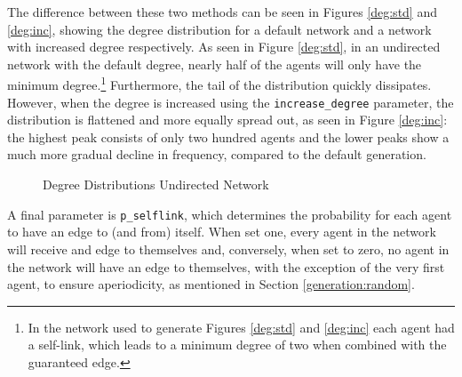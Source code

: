 \documentclass[a4paper, 12pt]{report}
\begin{document}
\noindent The difference between these two methods can be seen in Figures \ref{deg:std} and \ref{deg:inc}, showing the degree distribution for a default network and a network with increased degree respectively. As seen in Figure \ref{deg:std}, in an undirected network with the default degree, nearly half of the agents will only have the minimum degree.\footnote{In the network used to generate Figures \ref{deg:std} and \ref{deg:inc} each agent had a self-link, which leads to a minimum degree of two when combined with the guaranteed edge.} Furthermore, the tail of the distribution quickly dissipates. However, when the degree is increased using the \texttt{increase\_degree} parameter, the distribution is flattened and more equally spread out, as seen in Figure \ref{deg:inc}: the highest peak consists of only two hundred agents and the lower peaks show a much more gradual decline in frequency, compared to the default generation.
\begin{figure}[!htbp]
  \centering
  \hfill
  \caption{Degree Distributions Undirected Network}
\end{figure}

\noindent A final parameter is \texttt{p\_selflink}, which determines the probability for each agent to have an edge to (and from) itself. When set one, every agent in the network will receive and edge to themselves and, conversely, when set to zero, no agent in the network will have an edge to themselves, with the exception of the very first agent, to ensure aperiodicity, as mentioned in Section \ref{generation:random}.
\end{document}
